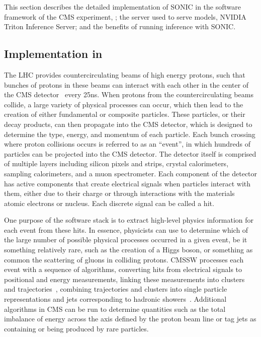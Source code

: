 This section describes the detailed implementation of SONIC in the software framework of the CMS experiment, \CMSSW; the server used to serve models, NVIDIA Triton Inference Server; and the benefits of running inference with SONIC.

\subsection{Implementation in \CMSSW}
\label{sec:implementation}

The LHC provides countercirculating beams of high energy protons, such that bunches of protons in these beams can interact with each other in the center of the CMS detector~\cite{CMS:2008xjf} every 25\unit{ns}. When protons from the countercirculating beams collide, a large variety of physical processes can occur, which then lead to the creation of either fundamental or composite particles. These particles, or their decay products, can then propagate into the CMS detector, which is designed to determine the type, energy, and momentum of each particle. Each bunch crossing where proton collisions occurs is referred to as an ``event'', in which hundreds of particles can be projected into the CMS detector. The detector itself is comprised of multiple layers including silicon pixels and strips, crystal calorimeters, sampling calorimeters, and a muon spectrometer. Each component of the detector has active components that create electrical signals when particles interact with them, either due to their charge or through interactions with the materials atomic electrons or nucleus. Each discrete signal can be called a hit.

One purpose of the \CMSSW software stack is to extract high-level physics information for each event from these hits. In essence, physicists can use \CMSSW to determine which of the large number of possible physical processes occurred in a given event, be it something relatively rare, such as the creation of a Higgs boson, or something as common the scattering of gluons in colliding protons. CMSSW processes each event with a sequence of algorithms, converting hits from electrical signals to positional and energy measurements, linking these measurements into clusters~\cite{CMS:2020uim} and trajectories~\cite{CMS:2014pgm}, combining trajectories and clusters into single particle representations and jets corresponding to hadronic showers~\cite{CMS:2017yfk}. Additional algorithms in CMS can be run to determine quantities such as the total imbalance of energy across the axis defined by the proton beam line or tag jets as containing or being produced by rare particles.

